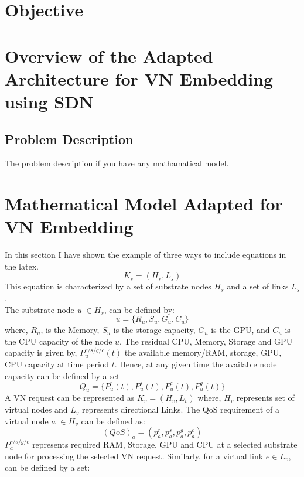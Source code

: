 \section{Objective}


\section{Overview of the Adapted Architecture for VN Embedding using SDN}

	\subsection{Problem Description} 
		The problem description if you have any mathamatical model.


\section{Mathematical Model Adapted for VN Embedding}
In this section I have shown the example of three ways to include equations in the latex.
\begin{equation}
 K_s = (H_s,L_s) 
\end{equation}
This equation is characterized by a set of substrate nodes $H_s$ and a set of links $L_s$.\\
The substrate node \textit{u} $\in H_s$, can be defined by:
\begin{equation}
u=\{R_u, S_u, G_u, C_u\}
\end{equation}
where, $R_u$, is the Memory, $S_u$ is the storage capacity, $G_u$ is the GPU, and $C_u$ is the CPU capacity of the node $u$.
The residual CPU, Memory, Storage and GPU capacity is given by,
$P^{r/s/g/c}_u(t)$ the available memory/RAM, storage, GPU, CPU capacity at time period $t$.
Hence, at any given time the available node capacity can be defined by a set 
\begin{equation}
Q_u = \{ P^r_u(t), P^s_u(t), P^c_u(t), P^g_u(t)\}
\end{equation}
A VN request can be represented as $K_v = (H_v, L_v)$ where, $H_v$ represents set of virtual nodes and $L_v$ represents directional Links.
The QoS requirement of a virtual node $a$ $\in H_v$ can be defined as:
\begin{equation}
(QoS)_a = (p_a^r, p_a^s, p_a^g, p_a^c)
\end{equation}
$P_a^{r/s/g/c} $ represents required RAM, Storage, GPU and CPU at a selected substrate node for processing the selected VN request. Similarly, for a virtual link $e \in L_v$, can be defined by a set:
